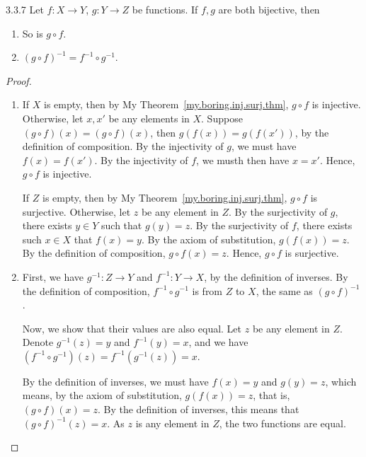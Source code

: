 \begin{exercise}{3.3.7}
	Let $f: X \to Y$, $g: Y \to Z$ be functions. If $f,g$ are both bijective, then
	\begin{enumerate}
		\item So is $g \circ f$.
		\item $(g \circ f)^{-1} = f^{-1} \circ g^{-1}$.
	\end{enumerate}
\end{exercise}
\begin{proof}\leavevmode
	\begin{enumerate}
		\item If $X$ is empty, then by My Theorem~\ref{my.boring.inj.surj.thm}, $g \circ f$ is injective. Otherwise, let $x,x'$ be any elements in $X$. Suppose $(g \circ f)(x) = (g \circ f)(x)$, then $g(f(x)) = g(f(x'))$, by the definition of composition. By the injectivity of $g$, we must have $f(x) = f(x')$. By the injectivity of $f$, we musth then have $x = x'$. Hence, $g \circ f$ is injective.
		
		If $Z$ is empty, then by My Theorem~\ref{my.boring.inj.surj.thm}, $g \circ f$ is surjective. Otherwise, let $z$ be any element in $Z$. By the surjectivity of $g$, there exists $y \in Y$ such that $g(y) = z$. By the surjectivity of $f$, there exists such $x \in X$ that $f(x) = y$. By the axiom of substitution, $g(f(x)) = z$. By the definition of composition, $g \circ f(x) = z$. Hence, $g \circ f$ is surjective.
		
		\item First, we have $g^{-1}: Z \to Y$ and $f^{-1}: Y \to X$, by the definition of inverses. By the definition of composition, $f^{-1} \circ g^{-1}$ is from $Z$ to $X$, the same as $(g \circ f)^{-1}$.
		
		Now, we show that their values are also equal. Let $z$ be any element in $Z$. Denote $g^{-1}(z) = y$ and $f^{-1}(y) = x$, and we have $(f^{-1} \circ g^{-1})(z) = f^{-1}(g^{-1}(z)) = x$.
		
		By the definition of inverses, we must have $f(x) = y$ and $g(y) = z$, which means, by the axiom of substitution, $g(f(x)) = z$, that is, $(g \circ f)(x) = z$. By the definition of inverses, this means that $(g \circ f)^{-1}(z) = x$. As $z$ is any element in $Z$, the two functions are equal.
	\end{enumerate}
\end{proof}

